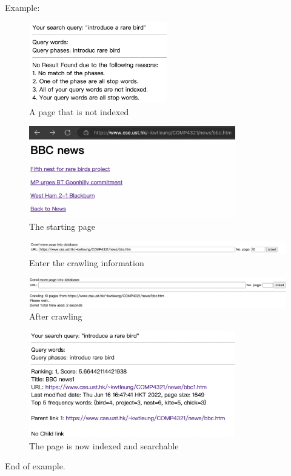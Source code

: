 \documentclass{article}
\begin{document}
            \newpage
            Example: 
            \begin{figure}[!htbp]
                \centering
                \includegraphics[width=6cm]{c1.png}
                \caption{A page that is not indexed}
            \end{figure}
            \begin{figure}[!htbp]
                \centering
                \includegraphics[width=9cm]{c2.png}
                \caption{The starting page}
            \end{figure}
            \begin{figure}[!htbp]
                \centering
                \includegraphics[width=15cm]{c3.png}
                \caption{Enter the crawling information}
            \end{figure}
            \begin{figure}[!htbp]
                \centering
                \includegraphics[width=15cm]{c4.png}
                \caption{After crawling}
            \end{figure}
            \begin{figure}[!htbp]
                \centering
                \includegraphics[width=9cm]{c5.png}
                \caption{The page is now indexed and searchable}
            \end{figure}
            \newpage
            End of example.
\end{document}
